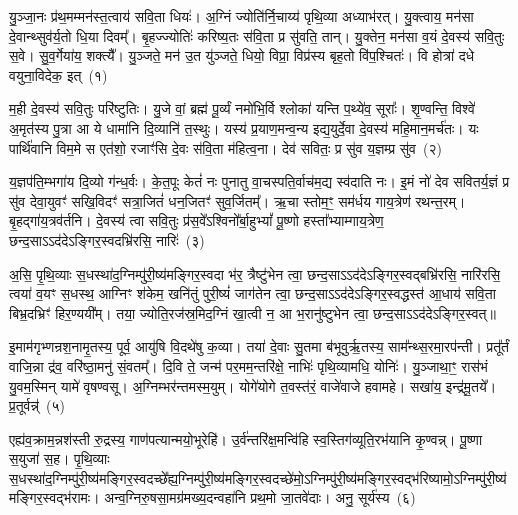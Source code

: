 \setcounter{anuvakam}{0}
यु॒ञ्जा॒नः प्र॑थ॒मम्मन॑स्त॒त्वाय॑ सवि॒ता धियः॑। अ॒ग्निं ज्योति॑र्नि॒चाय्य॑ पृथि॒व्या अध्याभ॑रत्। यु॒क्त्वाय॒ मन॑सा दे॒वान्थ्सुव॑र्य॒तो धि॒या दिवम्᳚। बृ॒हज्ज्योतिः॑ करिष्य॒तः स॑वि॒ता प्र सु॑वति॒ तान्। यु॒क्तेन॒ मन॑सा व॒यं दे॒वस्य॑ सवि॒तुः स॒वे। सु॒व॒र्गेया॑य॒ शक्त्यै᳚। यु॒ञ्जते॒ मन॑ उ॒त यु॑ञ्जते॒ धियो॒ विप्रा॒ विप्र॑स्य बृह॒तो वि॑प॒श्चितः॑। वि होत्रा॑ दधे वयुना॒विदेक॒ इत्~(१)

म॒ही दे॒वस्य॑ सवि॒तुः परि॑ष्टुतिः। यु॒जे वां॒ ब्रह्म॑ पू॒र्व्यं नमो॑भि॒र्वि श्लोका॑ यन्ति प॒थ्ये॑व॒ सूराः᳚। शृ॒ण्वन्ति॒ विश्वे॑ अ॒मृत॑स्य पु॒त्रा आ ये धामा॑नि दि॒व्यानि॑ त॒स्थुः। यस्य॑ प्र॒याण॒मन्व॒न्य इद्य॒युर्दे॒वा दे॒वस्य॑ महि॒मान॒मर्च॑तः। यः पार्थि॑वानि विम॒मे स एत॑शो॒ रजाꣳ॑सि दे॒वः स॑वि॒ता म॑हित्व॒ना। देव॑ सवितः॒ प्र सु॑व य॒ज्ञम्प्र सु॑व~(२)

य॒ज्ञप॑ति॒म्भगा॑य दि॒व्यो ग॑न्ध॒र्वः। के॒त॒पूः केतं॑ नः पुनातु वा॒चस्पति॒र्वाच॑म॒द्य स्व॑दाति नः। इ॒मं नो॑ देव सवितर्य॒ज्ञं प्र सु॑व देवा॒युवꣳ॑ सखि॒विदꣳ॑ सत्रा॒जितं॑ धन॒जितꣳ॑ सुव॒र्जितम्᳚। ऋ॒चा स्तोम॒ꣳ॒ सम॑र्धय गाय॒त्रेण॑ रथन्त॒रम्। बृ॒हद्गा॑य॒त्रव॑र्तनि। दे॒वस्य॑ त्वा सवि॒तुः प्र॑स॒वे᳚\-ऽश्विनो᳚र्बा॒हु\-भ्यां᳚ पू॒ष्णो हस्ता᳚भ्याम्गाय॒त्रेण॒ छन्द॒सा\-ऽ\-ऽद॑दे\-ऽङ्गिर॒स्वदभ्रि॑रसि॒ नारिः॑~(३)

अ॒सि॒ पृ॒थि॒व्याः स॒धस्था॑द॒ग्निम्पु॑री॒ष्य॑मङ्गिर॒स्वदा भ॑र॒ त्रैष्टु॑भेन त्वा॒ छन्द॒सा\-ऽ\-ऽद॑दे\-ऽङ्गिर॒स्वद्बभ्रि॑रसि॒ नारि॑रसि॒ त्वया॑ व॒यꣳ स॒धस्थ॒ आग्निꣳ श॑केम॒ खनि॑तुं पुरी॒ष्यं॑ जाग॑तेन त्वा॒ छन्द॒सा\-ऽ\-ऽद॑दे\-ऽङ्गिर॒स्वद्धस्त॑ आ॒धाय॑ सवि॒ता बिभ्र॒दभ्रिꣳ॑ हिर॒ण्ययी᳚म्। तया॒ ज्योति॒रज॑स्र॒मिद॒ग्निं खा॒त्वी न॒ आ भ॒रानु॑ष्टुभेन त्वा॒ छन्द॒सा\-ऽ\-ऽद॑दे\-ऽङ्गिर॒स्वत्॥

{\anuvakamend[{इद्य॒ज्ञं प्र सु॑व॒ नारि॒रानु॑ष्टुभेन त्वा॒ छन्द॑सा॒ त्रीणि॑ च}]}%

इ॒माम॑गृभ्णन्रश॒नामृ॒तस्य॒ पूर्व॒ आयु॑षि वि॒दथे॑षु क॒व्या। तया॑ दे॒वाः सु॒तमा ब॑भूवुर्\mbox{}ऋ॒तस्य॒ साम᳚न्थ्स॒रमा॒रप॑न्ती। प्रतू᳚र्तं वाजि॒न्ना द्र॑व॒ वरि॑ष्ठा॒मनु॑ सं॒वतम्᳚। दि॒वि ते॒ जन्म॑ पर॒मम॒न्तरि॑क्षे॒ नाभिः॑ पृथि॒व्यामधि॒ योनिः॑। यु॒ञ्जाथा॒ꣳ॒ रास॑भं यु॒वम॒स्मिन् यामे॑ वृषण्वसू। अ॒ग्निम्भर॑न्तमस्म॒युम्। योगे॑योगे त॒वस्त॑रं॒ वाजे॑वाजे हवामहे। सखा॑य॒ इन्द्र॑मू॒तये᳚। प्र॒तूर्वन्न्॑~(५)

एह्य॑व॒क्राम॒न्नश॑स्ती रु॒द्रस्य॒ गाण॑पत्यान्मयो॒भूरेहि॑। उ॒र्व॑न्तरि॑क्ष॒मन्वि॑हि स्व॒स्तिग॑व्यूति॒रभ॑यानि कृ॒ण्वन्न्। पू॒ष्णा स॒युजा॑ स॒ह। पृ॒थि॒व्याः स॒धस्था॑द॒ग्निम्पु॑री॒ष्य॑मङ्गिर॒स्वदच्छे᳚ह्य॒ग्निम्पु॑री॒ष्य॑मङ्गिर॒स्वदच्छे॑मो॒\-ऽग्निम्पु॑री॒ष्य॑मङ्गिर॒\-स्वद्भ॑रिष्यामो॒\-ऽग्निम्पु॑री॒ष्य॑मङ्गिर॒स्वद्भ॑रामः। अन्व॒ग्निरु॒षसा॒मग्र॑मख्य॒दन्वहा॑नि प्रथ॒मो जा॒तवे॑दाः। अनु॒ सूर्य॑स्य~(६)

